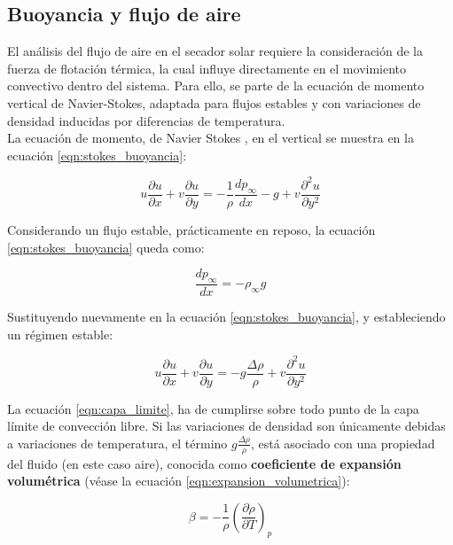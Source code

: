 \documentclass[12pt]{article}
\begin{document}
\subsection{Buoyancia y flujo de aire}
\label{subsec:buoyancia_y_flujo_de_aire}
El análisis del flujo de aire en el secador solar requiere la consideración de la fuerza de flotación térmica, la cual influye directamente en el movimiento convectivo dentro del sistema. Para ello, se parte de la ecuación de momento vertical de Navier-Stokes, adaptada para flujos estables y con variaciones de densidad inducidas por diferencias de temperatura.\\

La ecuación de momento, de Navier Stokes \cite{incropera_heatmass_2007}, en el vertical se muestra en la ecuación \ref{eqn:stokes_buoyancia}:

\begin{equation}
\label{eqn:stokes_buoyancia}
    u\frac{\partial u}{\partial x}+v\frac{\partial u}{\partial y} = -\frac{1}{\rho}\frac{dp_\infty}{dx}-g+v\frac{\partial^2u}{\partial y^2}
\end{equation}

Considerando un flujo estable, prácticamente en reposo, la ecuación \ref{eqn:stokes_buoyancia} queda como:

$$\frac{dp_\infty}{dx} = -\rho_\infty g$$

Sustituyendo nuevamente en la ecuación \ref{eqn:stokes_buoyancia}, y estableciendo un régimen estable:

\begin{equation}
\label{eqn:capa_limite}
    u\frac{\partial u}{\partial x}+v\frac{\partial u}{\partial y} = -g\frac{\Delta\rho}{\rho}+v\frac{\partial^2u}{\partial y^2}
\end{equation}


La ecuación \ref{eqn:capa_limite}, ha de cumplirse sobre todo punto de la capa límite de convección libre. Si las variaciones de densidad son únicamente debidas a variaciones de temperatura, el término $g\frac{\Delta\rho}{\rho}$, está asociado con una propiedad del fluido (en este caso aire), conocida como \textbf{coeficiente de expansión volumétrica} (véase la ecuación \ref{eqn:expansion_volumetrica}):

\begin{equation}
\label{eqn:expansion_volumetrica}
    \beta = -\frac{1}{\rho}\left(\frac{\partial\rho}{\partial T}\right)_p
\end{equation}
\end{document}
